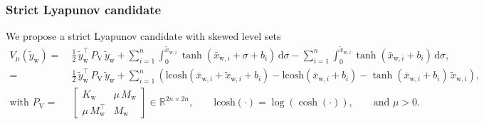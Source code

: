 \subsubsection{Strict Lyapunov candidate}
We propose a strict Lyapunov candidate with skewed level sets~\citep{wu2022passive}
\begin{equation}\label{eq:con:conw_lyapunov_function}
\begin{split}
    V_\mu(\tilde{y}_\mathrm{w}) =& \: \frac{1}{2} \, \tilde{y}_\mathrm{w}^\top \, P_\mathrm{V} \, \tilde{y}_\mathrm{w} + \sum_{i=1}^n \int_{0}^{\tilde{x}_{\mathrm{w},i}} \tanh(\bar{x}_{\mathrm{w},i}+\sigma+b_i) \, \mathrm{d} \sigma - \sum_{i=1}^n \int_{0}^{\tilde{x}_{\mathrm{w},i}} \tanh(\bar{x}_{\mathrm{w},i}+b_i) \, \mathrm{d} \sigma,\\
    =& \: \frac{1}{2} \, \tilde{y}_\mathrm{w}^\top \, P_\mathrm{V} \, \tilde{y}_\mathrm{w} + \sum_{i=1}^n \left ( \mathrm{lcosh}(\bar{x}_{\mathrm{w},i} + \tilde{x}_{\mathrm{w},i}+b_i)-\mathrm{lcosh}(\bar{x}_{\mathrm{w},i}+b_i)-\tanh(\bar{x}_{\mathrm{w},i}+b_i) \, \tilde{x}_{\mathrm{w},i} \right ),\\
    \text{with } P_\mathrm{V} =& \: \begin{bmatrix}
        K_\mathrm{w} & \mu \, M_\mathrm{w}\\
        \mu \, M_\mathrm{w}^\top & M_\mathrm{w}
    \end{bmatrix} \in \mathbb{R}^{2n \times 2n}, \qquad \mathrm{lcosh}(\cdot) = \log(\cosh(\cdot)), \qquad \text{and } \mu > 0.
\end{split}
\end{equation}

